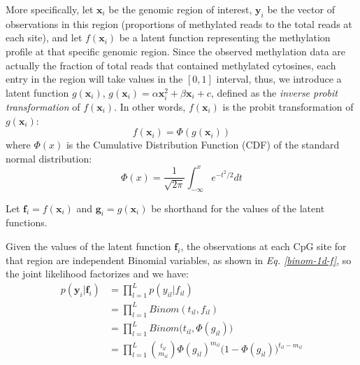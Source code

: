 More specifically, let $\mathbf{x}_{i}$ be the genomic region of interest, $\mathbf{y}_{i}$ be the vector of observations in this region (\ie proportions of methylated reads to the total reads at each site), and let $f(\mathbf{x}_{i})$ be a latent function representing the methylation profile at that specific genomic region. Since the observed methylation data are actually the fraction of total reads that contained methylated cytosines, each entry in the region will take values in the $[0, 1]$ interval, thus, we introduce a latent function $g(\mathbf{x}_{i})$, \eg $g(\mathbf{x}_{i}) = \alpha \mathbf{x}_{i}^{2} + \beta \mathbf{x}_{i} + c$, defined as the \emph{inverse probit transformation} of $f(\mathbf{x}_{i})$. In other words, $f(\mathbf{x}_{i})$ is the probit transformation of $g(\mathbf{x}_{i})$:
\begin{equation} \label{probit-transform-f}
	f(\mathbf{x}_{i}) = \Phi(g(\mathbf{x}_{i}))
\end{equation}
where $\Phi(x)$ is the Cumulative Distribution Function (CDF) of the standard normal distribution:
\begin{equation} \label{cdf-stand-normal-f}
	\Phi(x) = \frac{1}{\sqrt{2\pi}} \int_{-\infty}^{x} e^{-t^{2}/2}dt
\end{equation}

Let $\mathbf{f}_{i} = f(\mathbf{x}_{i})$ and $\mathbf{g}_{i} = g(\mathbf{x}_{i})$ be shorthand for the values of the latent functions.

Given the values of the latent function $\mathbf{f}_{i}$, the observations at each CpG site for that region are independent Binomial variables, as shown in \emph{Eq. \ref{binom-1d-f}}, so the joint likelihood factorizes and we have:
\begin{equation} \label{likel-binom-prob-f}
  \begin{split}
	p(\mathbf{y}_{i}|\mathbf{f}_{i}) & = \prod_{l=1}^{L} p(y_{il}|f_{il}) \\
							 & = \prod_{l=1}^{L} Binom(t_{il}, f_{il}) \\
							 & = \prod_{l=1}^{L} Binom\big(t_{il}, \Phi(g_{il})\big) \\
							 & = \prod_{l=1}^{L} \binom{t_{il}}{m_{il}} \Phi(g_{il})^{m_{il}} (1 - \Phi(g_{il})\big)^{t_{il} - m_{il}}
  \end{split}
\end{equation}

